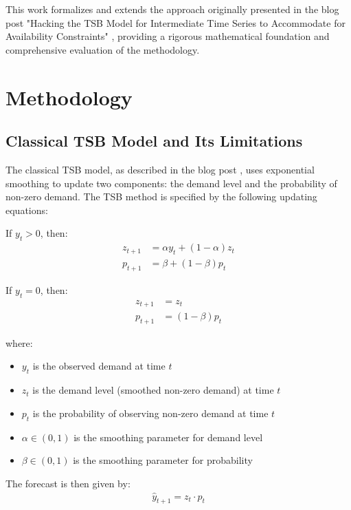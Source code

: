 \documentclass[11pt]{amsart}
\theoremstyle{definition}
\begin{document}
This work formalizes and extends the approach originally presented in the blog post "Hacking the TSB Model for Intermediate 
Time Series to Accommodate for Availability Constraints" \cite{orduz2024availability_tsb}, providing a rigorous 
mathematical foundation and comprehensive evaluation of the methodology.

\section{Methodology}

\subsection{Classical TSB Model and Its Limitations}

The classical TSB model, as described in the blog post \cite{orduz2023tsb_numpyro}, uses exponential smoothing to update 
two components: the demand level and the probability of non-zero demand. The TSB method is specified by the following 
updating equations:

If $y_t > 0$, then:
\begin{align}
z_{t+1} &= \alpha y_t + (1-\alpha) z_t \label{eq:tsb_demand_update}\\
p_{t+1} &= \beta + (1-\beta) p_t \label{eq:tsb_prob_update_nonzero}
\end{align}

If $y_t = 0$, then:
\begin{align}
z_{t+1} &= z_t \label{eq:tsb_demand_no_update}\\
p_{t+1} &= (1-\beta) p_t \label{eq:tsb_prob_update_zero}
\end{align}

where:
\begin{itemize}
    \item $y_t$ is the observed demand at time $t$
    \item $z_t$ is the demand level (smoothed non-zero demand) at time $t$
    \item $p_t$ is the probability of observing non-zero demand at time $t$
    \item $\alpha \in (0,1)$ is the smoothing parameter for demand level
    \item $\beta \in (0,1)$ is the smoothing parameter for probability
\end{itemize}

The forecast is then given by:
\begin{align}
\hat{y}_{t+1} = z_t \cdot p_t \label{eq:tsb_forecast}
\end{align}
\end{document}
